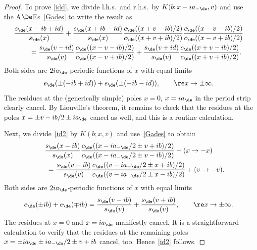 \begin{proof}
To prove \eqref{idd}, we divide l.h.s.\ and r.h.s.\ by $K(b;x-ia_{-\de},v)$ and use the A$\De$Es~\eqref{Gades} to write the result as
\begin{gather}
  \frac{s_{\de}(x-ib+id)}{s_{\de}(x)}+\frac{s_{\de}(x+ib-id)}{s_{\de}(x)}\frac{c_{\de}((x+ v-ib)/2)}{c_{\de}((x+ v+ib)/2)}\frac{c_{\de}((x- v-ib)/2)}{c_{\de}((x- v+ib)/2)}  \nonumber \\
\qquad{} = \frac{s_{\de}(v-id)}{s_{\de}(v)} \frac{c_{\de}((x-v-ib)/2)}{c_{\de}((x-v+ib)/2)} +   \frac{s_{\de}(v+id)}{s_{\de}(v)} \frac{c_{\de}((x+v-ib)/2)}{c_{\de}((x+v+ib)/2)}.\label{idq}
\end{gather}
Both sides are $2ia_{\de}$-periodic functions of $x$ with equal limits
\begin{gather}
e_{\de}(\pm (-ib+id))+e_{\de}(\pm (-ib-id)),\qquad \re x \to\pm\infty.
\end{gather}
The residues at the (generically simple) poles $x=0$, $x=ia_{\de}$ in the period strip clearly cancel. By Liouville's theorem, it remains to check that the residues at the poles $x=\pm v -ib/2\pm ia_{\de}$ cancel as well, and this is a routine calculation.

Next, we divide~\eqref{id2} by $K(b;x,v)$ and use~\eqref{Gades} to obtain
\begin{gather}
  \frac{s_{\de}(x-ib)}{s_{\de}(x)}\frac{c_{\de}((x-ia_{-\de}/2\pm v +ib)/2)}{c_{\de}((x-ia_{-\de}/2\pm v -ib)/2)}+ (x\to -x)
\nonumber \\
\qquad{} = \frac{s_{\de}(v-ib)}{s_{\de}(v)} \frac{c_{\de}((v-ia_{-\de}/2\pm x +ib)/2)}{c_{\de}((v-ia_{-\de}/2\pm x -ib)/2)}+ (v\to -v).
\end{gather}
Both sides are $2ia_{\de}$-periodic functions of $x$ with equal limits
\begin{gather}
e_{\de}(\pm ib)+e_{\de}(\mp ib)=\frac{s_{\de}(v-ib)}{s_{\de}(v)} +\frac{s_{\de}(v+ib)}{s_{\de}(v)},\qquad \re x \to\pm\infty.
\end{gather}
The residues at $x=0$ and $x=ia_{\de}$ manifestly cancel. It is a straightforward calculation to verify that the residues at the remaining poles $x=\pm ia_{\de}\pm ia_{-\de}/2\pm v +ib$ cancel, too. Hence~\eqref{id2} follows.


\end{proof}

